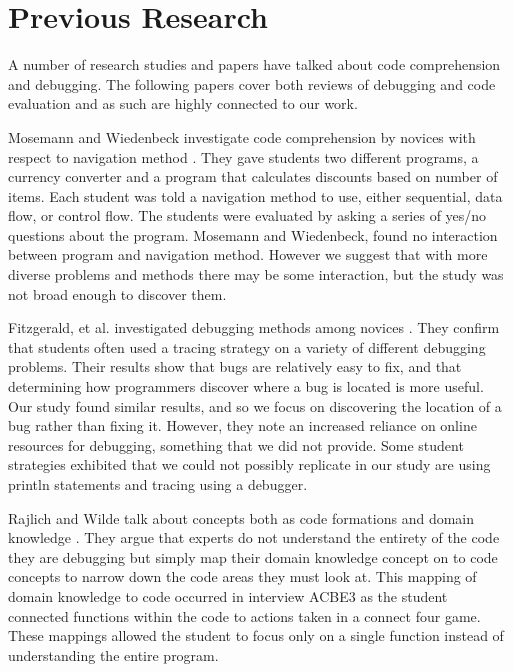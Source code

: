 \section{Previous Research}

A number of research studies and papers have talked about code comprehension and debugging.
The following papers cover both reviews of debugging and code evaluation and as such are highly connected to our work. 

Mosemann and Wiedenbeck investigate code comprehension by novices with respect to navigation method \cite{mosemann2001}.
They gave students two different programs, a currency converter and a program that calculates discounts based on number of items.
Each student was told a navigation method to use, either sequential, data flow, or control flow.
The students were evaluated by asking a series of yes/no questions about the program.
Mosemann and Wiedenbeck, found no interaction between program and navigation method.
However we suggest that with more diverse problems and methods there may be some interaction, but the study was not broad enough to discover them.

Fitzgerald, et al. investigated debugging methods among novices \cite{fitzgerald2008}.
They confirm that students often used a tracing strategy on a variety of different debugging problems.
Their results show that bugs are relatively easy to fix, and that determining how programmers discover where a bug is located is more useful.
Our study found similar results, and so we focus on discovering the location of a bug rather than fixing it.
However, they note an increased reliance on online resources for debugging, something that we did not provide.
Some student strategies exhibited that we could not possibly replicate in our study are using println statements and tracing using a debugger.

Rajlich and Wilde talk about concepts both as code formations and domain knowledge \cite{1021348}.
They argue that experts do not understand the entirety of the code they are debugging but simply map their domain knowledge concept on to code concepts to narrow down the code areas they must look at.
This mapping of domain knowledge to code occurred in interview ACBE3 as the student connected functions within the code to actions taken in a connect four game.
These mappings allowed the student to focus only on a single function instead of understanding the entire program.

